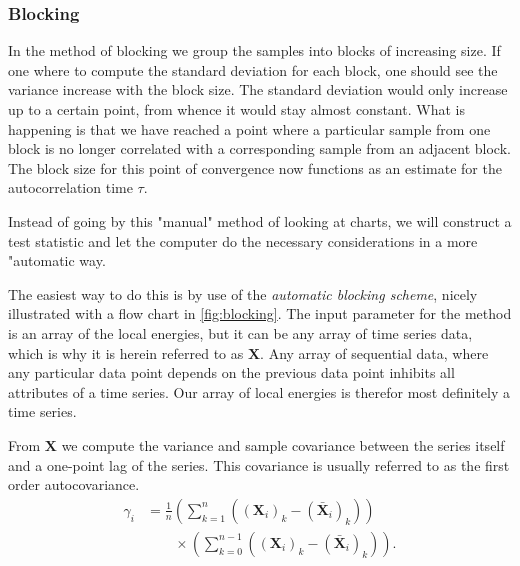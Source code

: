 \documentclass[
    a4paper, aps, twocolumn, floatfix, superscriptaddress, nofootinbib]{revtex4-1}
\newcommand{\1}{\mathds{1}}
\begin{document}
        \subsubsection{Blocking}
        In the method of blocking we group the samples into blocks of increasing size. If one where to compute
        the standard deviation for each block, one should see the variance increase with the block size.
        The standard deviation would only increase up to a certain point, from whence it would stay
        almost constant. What is happening is that we have reached a point where a particular
        sample from one block is no longer correlated with a corresponding sample from an adjacent block.
        The block size for this point of convergence now functions as an estimate for the autocorrelation
        time $\tau$.

         Instead of going by this "manual" method of looking at charts, we will construct a test statistic and
         let the computer do the necessary considerations in a more "automatic way.

        The easiest way to do this is by use of the \emph{automatic blocking scheme}, nicely illustrated
        with a flow chart in \autoref{fig:blocking}. The input parameter for the method is an array of the
        local energies, but it can be any array of time series data, which is why it is herein referred to as
        $\mathbf{X}$. Any array of sequential data, where any particular data point depends on the previous
        data point inhibits all attributes of a time series. Our array of local energies is therefor most definitely
        a time series.

        From $\mathbf{X}$ we compute the variance and sample covariance between the series itself and a
        one-point lag of the series. This covariance is usually referred to as the first order autocovariance.
        \begin{align}
            \gamma_i
            &= \frac{1}{n}
            \left(
                \sum_{k=1}^n
                \left((\mathbf{X}_i)_k - (\bar{\mathbf{X}}_i)_k\right)
            \right)
            \nonumber \\
            &\qquad
            \times
            \left(
                \sum_{k=0}^{n-1}
                \left((\mathbf{X}_i)_k - (\bar{\mathbf{X}}_i)_k\right)
            \right).
        \end{align}
\end{document}
